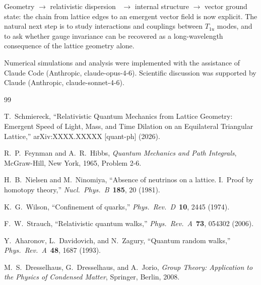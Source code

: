\documentclass[twocolumn,showpacs,preprintnumbers,amsmath,amssymb]{revtex4-2}
\begin{document}
Geometry $\to$ relativistic dispersion~\cite{schmiereck2026} $\to$
internal structure $\to$ vector ground state: the chain from lattice
edges to an emergent vector field is now explicit.
The natural next step is to study interactions and couplings
between $T_{1u}$ modes, and to ask whether gauge invariance can be
recovered as a long-wavelength consequence of the lattice geometry
alone.

\begin{acknowledgments}
Numerical simulations and analysis were implemented with the assistance
of Claude Code (Anthropic, claude-opus-4-6).
Scientific discussion was supported by Claude (Anthropic,
claude-sonnet-4-6).
\end{acknowledgments}

\begin{thebibliography}{99}

  T.~Schmiereck,
  ``Relativistic Quantum Mechanics from Lattice Geometry:
    Emergent Speed of Light, Mass, and Time Dilation on an Equilateral
    Triangular Lattice,''
  arXiv:XXXX.XXXXX [quant-ph] (2026).

  R.~P.~Feynman and A.~R.~Hibbs,
  \emph{Quantum Mechanics and Path Integrals},
  McGraw-Hill, New York, 1965, Problem 2-6.

  H.~B.~Nielsen and M.~Ninomiya,
  ``Absence of neutrinos on a lattice. I.\ Proof by homotopy theory,''
  \emph{Nucl.\ Phys.\ B}\ \textbf{185}, 20 (1981).

  K.~G.~Wilson,
  ``Confinement of quarks,''
  \emph{Phys.\ Rev.\ D}\ \textbf{10}, 2445 (1974).

  F.~W.~Strauch,
  ``Relativistic quantum walks,''
  \emph{Phys.\ Rev.\ A}\ \textbf{73}, 054302 (2006).

  Y.~Aharonov, L.~Davidovich, and N.~Zagury,
  ``Quantum random walks,''
  \emph{Phys.\ Rev.\ A}\ \textbf{48}, 1687 (1993).

  M.~S.~Dresselhaus, G.~Dresselhaus, and A.~Jorio,
  \emph{Group Theory: Application to the Physics of Condensed Matter},
  Springer, Berlin, 2008.

\end{thebibliography}
\end{document}
